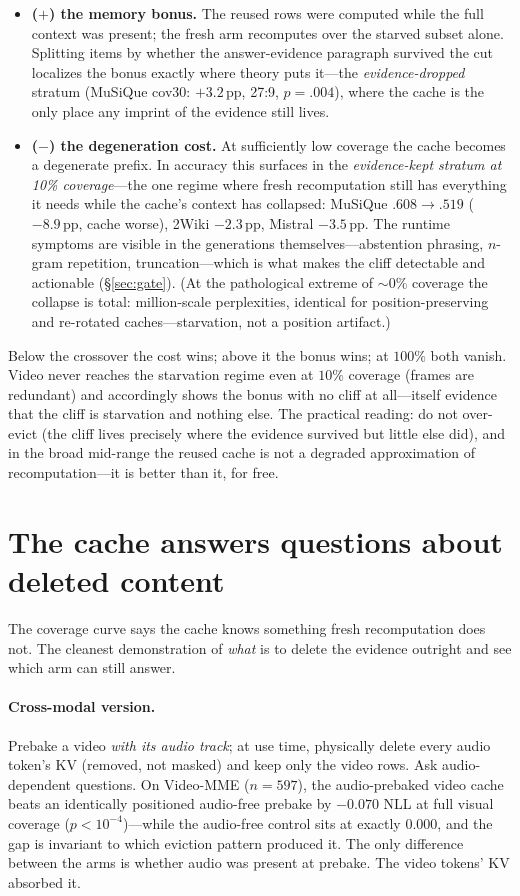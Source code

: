 \documentclass[11pt]{article}
\newcommand{\pp}{\,\mathrm{pp}}
\begin{document}
\begin{itemize}[leftmargin=2em]
\item \textbf{($+$) the memory bonus.} The reused rows were computed while the full context was present; the fresh arm recomputes over the starved subset alone. Splitting items by whether the answer-evidence paragraph survived the cut localizes the bonus exactly where theory puts it---the \emph{evidence-dropped} stratum (MuSiQue cov30: $+3.2\pp$, 27:9, $p{=}.004$), where the cache is the only place any imprint of the evidence still lives.
\item \textbf{($-$) the degeneration cost.} At sufficiently low coverage the cache becomes a degenerate prefix. In accuracy this surfaces in the \emph{evidence-kept stratum at 10\% coverage}---the one regime where fresh recomputation still has everything it needs while the cache's context has collapsed: MuSiQue $.608\rightarrow.519$ ($-8.9\pp$, cache worse), 2Wiki $-2.3\pp$, Mistral $-3.5\pp$. The runtime symptoms are visible in the generations themselves---abstention phrasing, $n$-gram repetition, truncation---which is what makes the cliff detectable and actionable (\S\ref{sec:gate}). (At the pathological extreme of ${\sim}0\%$ coverage the collapse is total: million-scale perplexities, identical for position-preserving and re-rotated caches---starvation, not a position artifact.)
\end{itemize}

Below the crossover the cost wins; above it the bonus wins; at $100\%$ both vanish. Video never reaches the starvation regime even at $10\%$ coverage (frames are redundant) and accordingly shows the bonus with no cliff at all---itself evidence that the cliff is starvation and nothing else. The practical reading: do not over-evict (the cliff lives precisely where the evidence survived but little else did), and in the broad mid-range the reused cache is not a degraded approximation of recomputation---it is better than it, for free.

\section{The cache answers questions about deleted content}
\label{sec:dropgold}

The coverage curve says the cache knows something fresh recomputation does not. The cleanest demonstration of \emph{what} is to delete the evidence outright and see which arm can still answer.

\paragraph{Cross-modal version.}
Prebake a video \emph{with its audio track}; at use time, physically delete every audio token's KV (removed, not masked) and keep only the video rows. Ask audio-dependent questions. On Video-MME ($n=597$), the audio-prebaked video cache beats an identically positioned audio-free prebake by $-0.070$ NLL at full visual coverage ($p<10^{-4}$)---while the audio-free control sits at exactly $0.000$, and the gap is invariant to which eviction pattern produced it. The only difference between the arms is whether audio was present at prebake. The video tokens' KV absorbed it.
\end{document}
